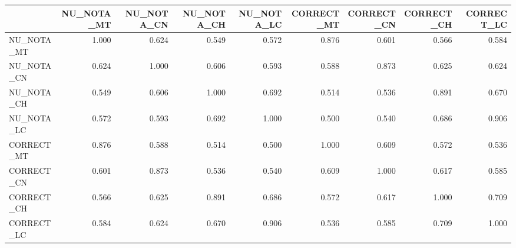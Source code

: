 \begin{tabular}{lrrrrrrrr}
\toprule
 & NU_NOTA_MT & NU_NOTA_CN & NU_NOTA_CH & NU_NOTA_LC & CORRECT_MT & CORRECT_CN & CORRECT_CH & CORRECT_LC \\
\midrule
NU_NOTA_MT & 1.000 & 0.624 & 0.549 & 0.572 & 0.876 & 0.601 & 0.566 & 0.584 \\
NU_NOTA_CN & 0.624 & 1.000 & 0.606 & 0.593 & 0.588 & 0.873 & 0.625 & 0.624 \\
NU_NOTA_CH & 0.549 & 0.606 & 1.000 & 0.692 & 0.514 & 0.536 & 0.891 & 0.670 \\
NU_NOTA_LC & 0.572 & 0.593 & 0.692 & 1.000 & 0.500 & 0.540 & 0.686 & 0.906 \\
CORRECT_MT & 0.876 & 0.588 & 0.514 & 0.500 & 1.000 & 0.609 & 0.572 & 0.536 \\
CORRECT_CN & 0.601 & 0.873 & 0.536 & 0.540 & 0.609 & 1.000 & 0.617 & 0.585 \\
CORRECT_CH & 0.566 & 0.625 & 0.891 & 0.686 & 0.572 & 0.617 & 1.000 & 0.709 \\
CORRECT_LC & 0.584 & 0.624 & 0.670 & 0.906 & 0.536 & 0.585 & 0.709 & 1.000 \\
\bottomrule
\end{tabular}
